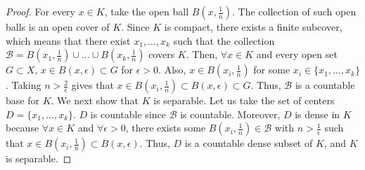 \documentclass[12pt]{article}
\begin{document}
\begin{exercise}{25}
    \begin{proof}
        For every $x \in K$, take the open ball $B(x, \frac{1}{n})$. The collection of such open balls is an open cover of $K$. Since $K$ is compact, there exists a finite subcover, which means that there exist $x_1, \dots, x_k$ such that the collection $\mathcal{B} = B(x_1, \frac{1}{n}) \cup \dots \cup B(x_k, \frac{1}{n})$ covers $K$. Then, $\forall x \in K$ and every open set $G \subset X$, $x \in B(x, \epsilon) \subset G$ for $\epsilon > 0$. Also, $x \in B(x_i, \frac{1}{n})$ for some $x_i \in \{ x_1, \dots, x_k \}$. Taking $n > \frac{2}{\epsilon}$ gives that $x \in B(x_i, \frac{1}{n}) \subset B(x, \epsilon) \subset G$. Thus, $\mathcal{B}$ is a countable base for $K$. We next show that $K$ is separable. Let us take the set of centers $D = \{ x_1, \dots, x_k \}$. $D$ is countable since $\mathcal{B}$ is countable. Moreover, $D$ is dense in $K$ because $\forall x \in K$ and $\forall \epsilon > 0$, there exists some $B(x_i, \frac{1}{n}) \in \mathcal{B}$ with $n > \frac{1}{\epsilon}$ such that $x \in B(x_i, \frac{1}{n}) \subset B(x, \epsilon)$. Thus, $D$ is a countable dense subset of $K$, and $K$ is separable. 
    \end{proof}
\end{exercise}
\end{document}
